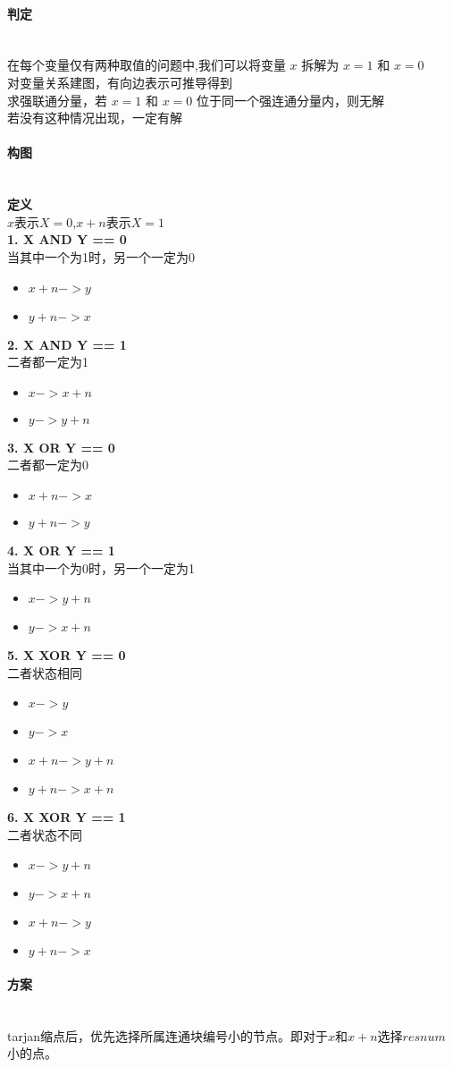 \paragraph{判定}~{}
\\
在每个变量仅有两种取值的问题中,我们可以将变量 $x$ 拆解为 $x=1$ 和 $x=0$ \\
对变量关系建图，有向边表示可推导得到 \\
求强联通分量，若 $x=1$ 和 $x=0$ 位于同一个强连通分量内，则无解\\
若没有这种情况出现，一定有解\\
\paragraph{构图}~{}
\\
\textbf{定义}\\
$x$表示$X=0$,$x+n$表示$X=1$\\
\textbf{1. X AND Y == 0}\\
当其中一个为1时，另一个一定为0
\begin{itemize}
\item $x+n->y$
\item $y+n->x$
\end{itemize}
\textbf{2. X AND Y == 1}\\
二者都一定为1
\begin{itemize}
\item $x->x+n$
\item $y->y+n$
\end{itemize}
\textbf{3. X OR Y == 0}\\
二者都一定为0
\begin{itemize}
\item $x+n->x$
\item $y+n->y$
\end{itemize}
\textbf{4. X OR Y == 1}\\
当其中一个为0时，另一个一定为1\\
\begin{itemize}
\item $x->y+n$
\item $y->x+n$
\end{itemize}
\textbf{5. X XOR Y == 0}\\
二者状态相同
\begin{itemize}
\item $x->y$
\item $y->x$
\item $x+n->y+n$
\item $y+n->x+n$
\end{itemize}
\textbf{6. X XOR Y == 1}\\
二者状态不同
\begin{itemize}
\item $x->y+n$
\item $y->x+n$
\item $x+n->y$
\item $y+n->x$
\end{itemize}

\paragraph{方案}~{}
\\
tarjan缩点后，优先选择所属连通块编号小的节点。即对于$x$和$x+n$选择$resnum$小的点。